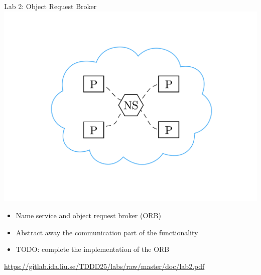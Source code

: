 \documentclass[compress,xcolor=table]{beamer}
\begin{document}
\begin{frame}{Lab 2: Object Request Broker}
  \centering
  \includegraphics[scale=0.10,page=1]{include/assets/name-service}
  \begin{itemize}
    \item Name service and object request broker (ORB)
    \item Abstract away the communication part of the functionality
    \item \alert{TODO}: complete the implementation of the ORB
  \end{itemize}
  \begin{center}
    \scriptsize \url{https://gitlab.ida.liu.se/TDDD25/labs/raw/master/doc/lab2.pdf}
  \end{center}
\end{frame}
\end{document}
